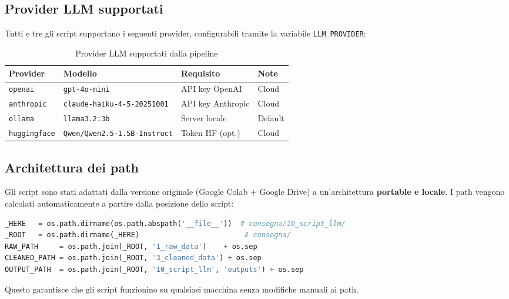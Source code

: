 \documentclass[12pt,a4paper]{article}
\begin{document}
\subsection{Provider LLM supportati}

Tutti e tre gli script supportano i seguenti provider, configurabili tramite
la variabile \texttt{LLM\_PROVIDER}:

\begin{table}[H]
  \centering
  \begin{tabular}{llll}
    \toprule
    \textbf{Provider} & \textbf{Modello} & \textbf{Requisito} & \textbf{Note} \\
    \midrule
    \texttt{openai}      & \texttt{gpt-4o-mini}              & API key OpenAI    & Cloud \\
    \texttt{anthropic}   & \texttt{claude-haiku-4-5-20251001} & API key Anthropic & Cloud \\
    \texttt{ollama}      & \texttt{llama3.2:3b}              & Server locale     & Default \\
    \texttt{huggingface} & \texttt{Qwen/Qwen2.5-1.5B-Instruct} & Token HF (opt.) & Cloud \\
    \bottomrule
  \end{tabular}
  \caption{Provider LLM supportati dalla pipeline}
\end{table}

\subsection{Architettura dei path}

Gli script sono stati adattati dalla versione originale (Google Colab +
Google Drive) a un'architettura \textbf{portable e locale}. I path vengono
calcolati automaticamente a partire dalla posizione dello script:

\begin{lstlisting}[language=Python]
_HERE   = os.path.dirname(os.path.abspath('__file__'))  # consegna/10_script_llm/
_ROOT   = os.path.dirname(_HERE)                         # consegna/
RAW_PATH     = os.path.join(_ROOT, '1_raw_data')    + os.sep
CLEANED_PATH = os.path.join(_ROOT, '3_cleaned_data') + os.sep
OUTPUT_PATH  = os.path.join(_ROOT, '10_script_llm', 'outputs') + os.sep
\end{lstlisting}

Questo garantisce che gli script funzionino su qualsiasi macchina senza
modifiche manuali ai path.

\end{document}
